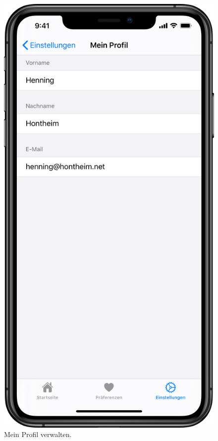 \begin{minipage}{.45\textwidth}
	\begin{figure}[H]
		\centering
		\includegraphics[width=.68\textwidth]{./images/prototype/ios/profile.png}
		\caption{\label{fig:app:ios:profile}Mein Profil verwalten.}
	\end{figure}
\end{minipage}\hfill
